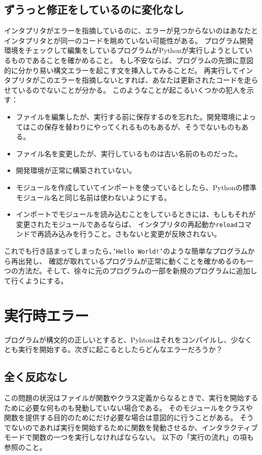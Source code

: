 \documentclass[a4j,12pt,makeidx]{jbook}
\begin{document}
\subsection*{ずうっと修正をしているのに変化なし}
インタプリタがエラーを指摘しているのに、エラーが見つからないのはあなたとインタプリタとが同一のコードを眺めていない可能性がある。
プログラム開発環境をチェックして編集をしているプログラムがPythonが実行しようとしているものであることを確かめること。
もし不安ならば、プログラムの先頭に意図的に分かり易い構文エラーを起こす文を挿入してみることだ。
再実行してインタプリタがこのエラーを指摘しないとすれば、あなたは更新されたコードを走らせているのでないことが分かる。
このようなことが起こるいくつかの犯人を示す：
\begin{itemize}
\item ファイルを編集したが、実行する前に保存するのを忘れた。開発環境によってはこの保存を替わりにやってくれるものもあるが、そうでないものもある。
\item ファイル名を変更したが、実行しているものは古い名前のものだった。
\item 開発環境が正常に構築されていない。
\item モジュールを作成していてインポートを使っているとしたら、Pythonの標準モジュール名と同じ名前は使わないようにする。
\item インポートでモジュールを読み込むことをしているときには、もしもそれが変更されたモジュールであるならば、
インタプリタの再起動か{\tt reload}コマンドで再読み込みを行うこと。さもないと変更が反映されない。
\end{itemize}
これでも行き詰まってしまったら、{\tt 'Hello World!'}のような簡単なプログラムから再出発し、
確認が取れているプログラムが正常に動くことを確かめるのも一つの方法だ。そして、徐々に元のプログラムの一部を新規のプログラムに追加して行くようにする。
%
\section{実行時エラー}
プログラムが構文的の正しいとすると、Pyhtonはそれをコンパイルし、少なくとも実行を開始する。次ぎに起こるとしたらどんなエラーだろうか？
\subsection*{全く反応なし}
この問題の状況はファイルが関数やクラス定義からなるときで、実行を開始するために必要な何ものも発動していない場合である。
そのモジュールをクラスや関数を提供する目的のためにだけ必要な場合は意図的に行うことがある。
そうでないのであれば実行を開始するために関数を発動させるか、インタラクティブモードで関数の一つを実行しなければならない。
以下の「実行の流れ」の項も参照のこと。
\end{document}
